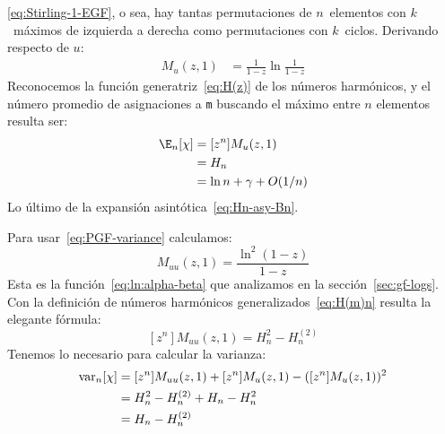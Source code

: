     \eqref{eq:Stirling-1-EGF},%
  o sea,
  hay tantas permutaciones de \(n\)~elementos
  con \(k\)~máximos de izquierda a derecha
  como permutaciones con \(k\)~ciclos.%
  Derivando respecto de \(u\):
  \begin{align*}
    M_u(z, 1)
      &= \frac{1}{1 - z} \ln \frac{1}{1 - z}
  \end{align*}
  Reconocemos la función generatriz~\eqref{eq:H(z)}
  de los números harmónicos,%
  y el número promedio de asignaciones a \lstinline!m!
  buscando el máximo entre \(n\) elementos resulta ser:%
  \begin{align}
    \E_n[\chi]
      &= [z^n] M_u(z, 1) \notag \\
      &= H_n  \label{eq:En-max} \\
      &= \ln n + \gamma + O(1 / n) \label{eq:En-max-asy}
  \end{align}
  Lo último de la expansión asintótica~\eqref{eq:Hn-asy-Bn}.

  Para usar~\eqref{eq:PGF-variance} calculamos:
  \begin{equation}
    \label{eq:Muu}
    M_{u u}(z, 1)
      = \frac{\ln^2 (1 - z)}{1 - z}
  \end{equation}
  Esta es la función~\eqref{eq:ln:alpha-beta}
  que analizamos en la sección~\ref{sec:gf-logs}.
  Con la definición de números harmónicos generalizados~\eqref{eq:H(m)n}%
  resulta la elegante fórmula:
  \begin{equation}
    \label{eq:Muu-coef}
    [z^n] M_{u u}(z, 1)
      = H^2_n - H^{(2)}_n
  \end{equation}
  Tenemos lo necesario para calcular la varianza:%
  \begin{align}
    \operatorname{var}_n[\chi]
      &= [z^n] M_{u u}(z, 1) + [z^n] M_u(z, 1) - ([z^n] M_u(z, 1))^2 \notag \\
      &= H^2_n - H^{(2)}_n + H_n - H^2_n \notag \\
      &= H_n - H^{(2)}_n
	  \label{eq:varn-max}
  \end{align}

